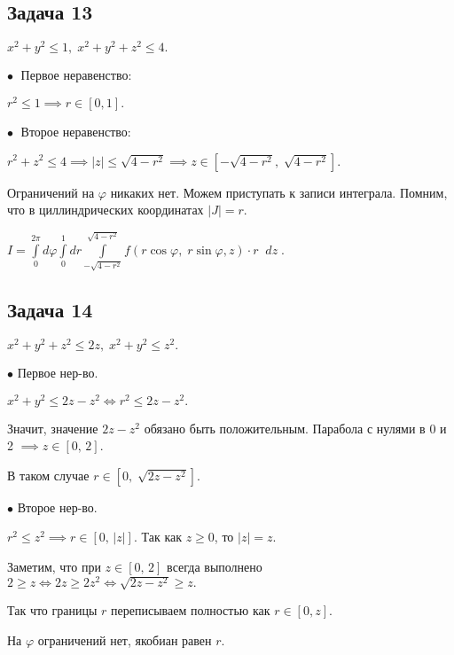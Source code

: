 \documentclass[a4paper, fleqn]{article}
\begin{document}
    \subsection*{Задача 13}
    
    $x^2 + y^2 \leq 1, \; x^2 + y^2 + z^2 \leq 4.$
    
    $\bullet \; $ Первое неравенство:
    
    $r^2 \leq 1 \implies r \in [0,1].$
    
    $\bullet \; $ Второе неравенство:
    
    $r^2 + z^2 \leq 4 \implies |z| \leq \sqrt{4 - r^2} \implies z \in [-\sqrt{4 - r^2}, \; \sqrt{4 - r^2}].$
    
    Ограничений на  $\varphi$ никаких нет. Можем приступать к записи интеграла. Помним, что в циллиндрических координатах $|J| = r.$
    
    $I = \boxed{\displaystyle \int\limits_{0}^{2 \pi} d \varphi \int\limits_{0}^{1} dr \int\limits_{-\sqrt{4 - r^2}}^{\sqrt{4 - r^2}} f(r \cos \varphi, \; r \sin \varphi, z) \cdot r \; \; dz} \; .$
    
    
    
    
    
    \subsection*{Задача 14}
    
    $x^2 + y^2 + z^2 \leq  2z, \; x^2 + y^2 \leq z^2.$
    
    $\bullet$ Первое нер-во.
    
    $x^2 + y^2 \leq 2z - z^2 \iff r^2 \leq 2z-z^2.$ 
    
    Значит, значение $2z - z^2$ обязано быть положительным. Парабола с нулями в 0 и 2 $\implies z \in [0, \, 2].$
    
    В таком случае $r \in \left[0, \; \sqrt{2z - z^2} \right].$
    
    $\bullet$ Второе нер-во.
    
    $r^2 \leq z^2 \implies r \in \left[0, \, |z|\right].$ Так как $z \geq 0$, то $|z| = z.$ 
    
    Заметим, что при $z \in [0, \, 2]$ всегда выполнено $2 \geq z \iff 2z \geq 2z^2 \iff \sqrt{2z - z^2} \geq z .$
    
    Так что границы $r$ переписываем полностью как $r \in [0,z].$
    
    На $\varphi$ ограничений нет, якобиан равен $r$.
    
\end{document}
